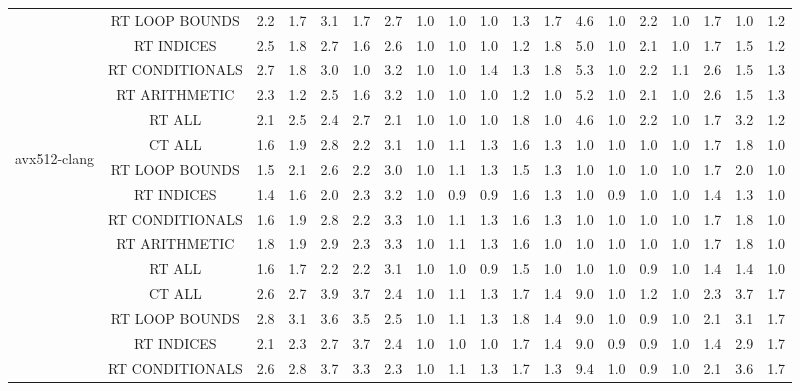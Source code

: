 \begin{adjustbox}{center}
\begin{tabular}{|c|c|c|c|c|c|c|c|c|c|c|c|c|c|c|c|c|c|c|}
 & RT LOOP BOUNDS & 2.2 & 1.7 & 3.1 & 1.7 & 2.7 & 1.0 & 1.0 & 1.0 & 1.3 & 1.7 & 4.6 & 1.0 & 2.2 & 1.0 & 1.7 & 1.0 & 1.2 \\ 
 & RT INDICES & 2.5 & 1.8 & 2.7 & 1.6 & 2.6 & 1.0 & 1.0 & 1.0 & 1.2 & 1.8 & 5.0 & 1.0 & 2.1 & 1.0 & 1.7 & 1.5 & 1.2 \\ 
 & RT CONDITIONALS & 2.7 & 1.8 & 3.0 & 1.0 & 3.2 & 1.0 & 1.0 & 1.4 & 1.3 & 1.8 & 5.3 & 1.0 & 2.2 & 1.1 & 2.6 & 1.5 & 1.3 \\ 
 & RT ARITHMETIC & 2.3 & 1.2 & 2.5 & 1.6 & 3.2 & 1.0 & 1.0 & 1.0 & 1.2 & 1.0 & 5.2 & 1.0 & 2.1 & 1.0 & 2.6 & 1.5 & 1.3 \\ 
 & RT ALL & 2.1 & 2.5 & 2.4 & 2.7 & 2.1 & 1.0 & 1.0 & 1.0 & 1.8 & 1.0 & 4.6 & 1.0 & 2.2 & 1.0 & 1.7 & 3.2 & 1.2 \\ 
\hline 
  \multirow{7}{*}{\begin{turn}{90}avx512-clang\end{turn}} & CT ALL &1.6 & 1.9 & 2.8 & 2.2 & 3.1 & 1.0 & 1.1 & 1.3 & 1.6 & 1.3 & 1.0 & 1.0 & 1.0 & 1.0 & 1.7 & 1.8 & 1.0 \\ 
 & RT LOOP BOUNDS & 1.5 & 2.1 & 2.6 & 2.2 & 3.0 & 1.0 & 1.1 & 1.3 & 1.5 & 1.3 & 1.0 & 1.0 & 1.0 & 1.0 & 1.7 & 2.0 & 1.0 \\ 
 & RT INDICES & 1.4 & 1.6 & 2.0 & 2.3 & 3.2 & 1.0 & 0.9 & 0.9 & 1.6 & 1.3 & 1.0 & 0.9 & 1.0 & 1.0 & 1.4 & 1.3 & 1.0 \\ 
 & RT CONDITIONALS & 1.6 & 1.9 & 2.8 & 2.2 & 3.3 & 1.0 & 1.1 & 1.3 & 1.6 & 1.3 & 1.0 & 1.0 & 1.0 & 1.0 & 1.7 & 1.8 & 1.0 \\ 
 & RT ARITHMETIC & 1.8 & 1.9 & 2.9 & 2.3 & 3.3 & 1.0 & 1.1 & 1.3 & 1.6 & 1.0 & 1.0 & 1.0 & 1.0 & 1.0 & 1.7 & 1.8 & 1.0 \\ 
 & RT ALL & 1.6 & 1.7 & 2.2 & 2.2 & 3.1 & 1.0 & 1.0 & 0.9 & 1.5 & 1.0 & 1.0 & 1.0 & 0.9 & 1.0 & 1.4 & 1.4 & 1.0 \\ 
\hline 
  \multirow{7}{*}{\begin{turn}{90}avx512-gcc\end{turn}} & CT ALL &2.6 & 2.7 & 3.9 & 3.7 & 2.4 & 1.0 & 1.1 & 1.3 & 1.7 & 1.4 & 9.0 & 1.0 & 1.2 & 1.0 & 2.3 & 3.7 & 1.7 \\ 
 & RT LOOP BOUNDS & 2.8 & 3.1 & 3.6 & 3.5 & 2.5 & 1.0 & 1.1 & 1.3 & 1.8 & 1.4 & 9.0 & 1.0 & 0.9 & 1.0 & 2.1 & 3.1 & 1.7 \\ 
 & RT INDICES & 2.1 & 2.3 & 2.7 & 3.7 & 2.4 & 1.0 & 1.0 & 1.0 & 1.7 & 1.4 & 9.0 & 0.9 & 0.9 & 1.0 & 1.4 & 2.9 & 1.7 \\ 
 & RT CONDITIONALS & 2.6 & 2.8 & 3.7 & 3.3 & 2.3 & 1.0 & 1.1 & 1.3 & 1.7 & 1.3 & 9.4 & 1.0 & 0.9 & 1.0 & 2.1 & 3.6 & 1.7 \\ 

\end{tabular}
\end{adjustbox}
